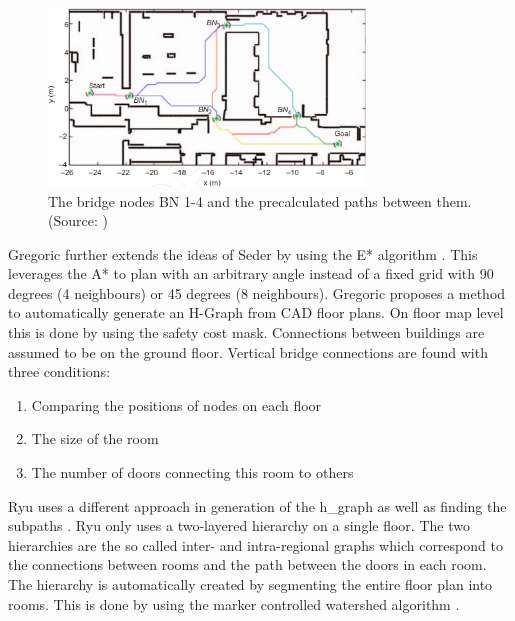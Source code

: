\begin{figure}[h]
    \centering
    \includegraphics[width=0.75\textwidth]{figures/20_state_of_the_art/bridge_node_placement_paths.png}
    \caption[The bridge nodes with precalculated paths]{The bridge nodes BN 1-4 and the precalculated paths between them. (Source: \cite{seder_hierarchical_2011})}
    \label{fig:bridge_node_placement}
\end{figure}

Gregoric \cite{gregoric_autonomous_2022} further extends the ideas of Seder by using the E* algorithm \cite{philippsen_interpolated_2005}. This leverages the A* to plan with an arbitrary angle instead of a fixed grid with 90 degrees (4 neighbours) or 45 degrees (8 neighbours). Gregoric proposes a method to automatically generate an H-Graph from CAD floor plans. On floor map level this is done by using the safety cost mask. Connections between buildings are assumed to be on the ground floor. Vertical bridge connections are found with three conditions: 

\begin{enumerate}
    \item Comparing the positions of nodes on each floor
    \item The size of the room 
    \item The number of doors connecting this room to others
\end{enumerate}

Ryu uses a different approach in generation of the \gls{h_graph} as well as finding the subpaths \cite{ryu_hierarchical_2020}. Ryu only uses a two-layered hierarchy on a single floor. The two hierarchies are the so called inter- and intra-regional graphs which correspond to the connections between rooms and the path between the doors in each room. The hierarchy is automatically created by segmenting the entire floor plan into rooms. This is done by using the marker controlled watershed algorithm \cite{parvati_image_2009}. 

